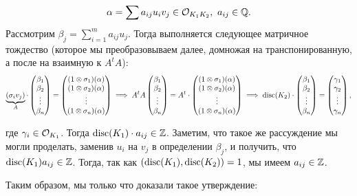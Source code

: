 	\[
		\alpha = \sum a_{i j} u_i v_j \in \mathcal{O}_{K_1 K_2}, \ a_{i j} \in \mathbb{Q}.
	\]
	Рассмотрим $\beta_j = \sum_{i = 1}^{m} a_{i j } u_j$. Тогда выполняется следующее матричное тождество (которое мы преобразовываем далее, домножая на транспонированную, а после на взаимную к $A^{t}A$):
	\[
		\underbrace{(\sigma_i v_j)}_{A} \cdot \begin{pmatrix} \beta_1 \\ \beta_2 \\ \vdots \\ \beta_n \end{pmatrix} = \begin{pmatrix} (1 \otimes \sigma_1)(\alpha) \\ (1 \otimes \sigma_2)(\alpha) \\ \vdots \\ (1 \otimes \sigma_n)(\alpha) \end{pmatrix} \implies A^t A \begin{pmatrix} \beta_1 \\ \beta_2 \\ \vdots \\ \beta_n \end{pmatrix} = A^t \cdot \begin{pmatrix} (1 \otimes \sigma_1)(\alpha) \\ (1 \otimes \sigma_2)(\alpha) \\ \vdots \\ (1 \otimes \sigma_n)(\alpha) \end{pmatrix} \implies \operatorname{disc}(K_2) \cdot \begin{pmatrix} \beta_1 \\ \beta_2 \\ \vdots \\ \beta_n \end{pmatrix} = \begin{pmatrix} \gamma_1 \\ \gamma_2 \\ \vdots \\ \gamma_n \end{pmatrix},
	\]

	где $\gamma_i \in \mathcal{O}_{K_1}$. Тогда $\operatorname{disc}(K_1) \cdot a_{i j} \in \mathbb{Z}$. Заметим, что такое же рассуждение мы могли проделать, заменив $u_i$ на $v_j$ в определении $\beta_j$, и получить, что $\operatorname{disc}(K_1) a_{i j} \in \mathbb{Z}$. Тогда, так как $(\operatorname{disc}(K_1), \operatorname{disc}(K_2)) = 1$, мы имеем $a_{i j} \in \mathbb{Z}$.

	Таким образом, мы только что доказали такое утверждение: 

